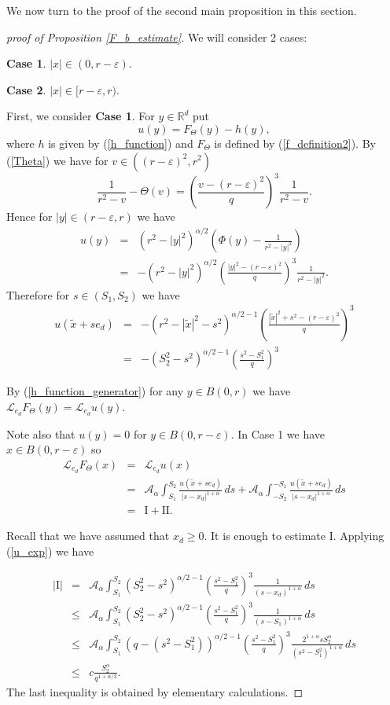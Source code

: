 \documentclass[a4paper,12pt,reqno]{amsart}
\theoremstyle{definition}
\theoremstyle{remark}
\newcommand{\eps}{\varepsilon}
\newcommand{\calA}{\mathcal{A}}
\newcommand{\calL}{\mathcal{L}}
\newcommand{\R}{\mathds{R}}
\begin{document}
We now turn to the proof of the second main proposition in this section.
\begin{proof}[proof of Proposition \ref{F_b_estimate}]
We will consider 2 cases:

{\bf Case 1}. $|x| \in (0, r - \eps)$.

{\bf Case 2}. $|x| \in [r -\eps, r )$.


\vskip 2pt
First, we consider {\bf Case 1}.
%
%
 For $y \in \R^d$ put
$$
u(y) = F_{\Theta}(y) -  h(y),
$$
where $h$ is given by (\ref{h_function}) and $F_{\Theta}$ is defined by (\ref{f_definition2}). By (\ref{Theta}) we have for $v \in ((r -\eps)^2, r^2)$ 
$$\frac{1}{r^2 - v} - \Theta(v) = \left(\frac{v- (r - \eps)^2}q\right)^3\frac{1}{r^2 - v}.
$$
Hence for $|y| \in (r - \eps, r)$ we have 
\begin{eqnarray}
\nonumber
u(y) &=&  (r^2 - |y|^2)^{\alpha/2} \left(\varPhi(y) - \frac{1}{r^2 - |y|^2}\right)\\
&=&  -(r^2 - |y|^2)^{\alpha/2}\left(\frac{|y|^2 - (r - \eps)^2}q\right)^3\frac{1}{r^2 - |y|^2}.\label{u_formula1I} 
\end{eqnarray} 
Therefore for $s \in (S_1, S_2)$ we have 
\begin{eqnarray}u(\tilde{x} +s e_d)&=&-(r^2 - |\tilde{x}|^2-s^2)^{\alpha/2-1}\left(\frac{|\tilde{x}|^2+s^2 - (r - \eps)^2}q\right)^3\nonumber\\
&=&-(S_2^2-s^2)^{\alpha/2-1}\left(\frac{s^2-S_1^2}q\right)^3 \label{u_exp}
\end{eqnarray}

 By (\ref{h_function_generator}) for any $y \in B(0,r)$ we have $\calL_{e_d} F_{\Theta}(y) = \calL_{e_d} u(y)$.
 
 Note also that $u(y) = 0$ for $y \in B(0,r - \eps)$. In Case 1 we have $x \in B(0,r - \eps)$ so
\begin{eqnarray*}
\calL_{e_d} F_{\Theta}(x) &=& \calL_{e_d} u(x)\\
&=& \calA_{\alpha} \int_{S_1}^{S_2} \frac{u(\tilde{x} +s e_d)}{|s - x_d|^{1+\alpha}} \, ds
+   \calA_{\alpha} \int_{-S_2}^{-S_1} \frac{u(\tilde{x} +s e_d)}{|s - x_d|^{1+\alpha}}  \, ds\\
&=& \text{I} + \text{II}.
\end{eqnarray*}

Recall that we have assumed that $x_d\ge 0$. It is enough to estimate $\text{I}$. Applying (\ref{u_exp}) we have 

\begin{eqnarray*}
|\text{I}|
&=& \calA_{\alpha} \int_{S_{1}}^{S_{2}} 
(S_2^2-s^2)^{\alpha/2-1}\left(\frac{s^2-S_1^2}q\right)^3\frac1{(s - x_d)^{1+\alpha} }
 \, ds\\
&\le& \calA_{\alpha} \int_{S_{1}}^{S_{2}} 
(S_2^2-s^2)^{\alpha/2-1}\left(\frac{s^2-S_1^2}q\right)^3\frac1{(s - S_1)^{1+\alpha} }
 \, ds\\ 
 &\le& \calA_{\alpha} \int_{S_{1}}^{S_{2}} 
(q-(s^2-S_1^2))^{\alpha/2-1}\left(\frac{s^2-S_1^2}q\right)^3\frac{2^{1+\alpha}s S_2^\alpha}{(s^2 - S_1^2)^{1+\alpha} }\, ds\\
&\le& c\frac{S_{2}^\alpha}{q^{1+\alpha/2}}.
\end{eqnarray*}
The last inequality is obtained by elementary calculations.



\end{proof}
\end{document}
